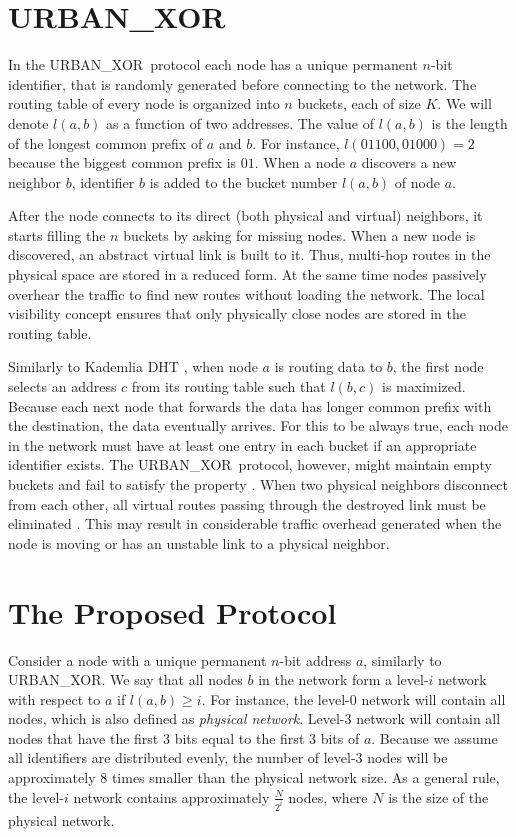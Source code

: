 \documentclass[conference]{IEEEtran}
\theoremstyle{definition}
\newcommand{\urbanxor}{URBAN\_XOR}
\begin{document}
\section{\urbanxor}
\label{sec:urbanxor}

In the \urbanxor\ protocol each node has a unique permanent $n$-bit identifier, that is randomly generated before connecting to the network. The routing table of every node is organized into $n$ buckets, each of size $K$. We will denote $l(a,b)$ as a function of two addresses. The value of $l(a,b)$ is the length of the longest common prefix of $a$ and $b$. For instance, $l(01100, 01000) = 2$ because the biggest common prefix is $01$. When a node $a$ discovers a new neighbor $b$, identifier $b$ is added to the bucket number $l(a,b)$ of node $a$.

After the node connects to its direct (both physical and virtual) neighbors, it starts filling the $n$ buckets by asking for missing nodes. When a new node is discovered, an abstract virtual link is built to it. Thus, multi-hop routes in the physical space are stored in a reduced form. At the same time nodes passively overhear the traffic to find new routes without loading the network. The local visibility concept ensures that only physically close nodes are stored in the routing table.

Similarly to Kademlia DHT \cite{kademlia}, when node $a$ is routing data to $b$, the first node selects an address $c$ from its routing table such that $l(b,c)$ is maximized. Because each next node that forwards the data has longer common prefix with the destination, the data eventually arrives. For this to be always true, each node in the network must have at least one entry in each bucket if an appropriate identifier exists. The \urbanxor\ protocol, however, might maintain empty buckets and fail to satisfy the property \cite{Pasquini}.
When two physical neighbors disconnect from each other, all virtual routes passing through the destroyed link must be eliminated \cite{Pasquini}. This may
result in considerable traffic overhead generated when
the node is moving or has an unstable link to a physical neighbor.


\section{The Proposed Protocol}
\label{sec:bmlrp}

Consider a node with a unique permanent $n$-bit address $a$, similarly to \urbanxor. We say that all nodes $b$ in the network form a level-$i$ network with respect to $a$ if $l(a,b) \ge i$. For instance, the level-0 network will contain all nodes, which is also defined as \emph{physical network}. Level-3 network will contain all nodes that have the first 3 bits equal to the first 3 bits of $a$. Because we assume all identifiers are distributed evenly, the number of level-3 nodes will be approximately 8 times smaller than the physical network size. As a general rule, the level-$i$ network contains approximately $\frac{N}{2^i}$ nodes, 
where $N$ is the size of the physical network.
\end{document}
